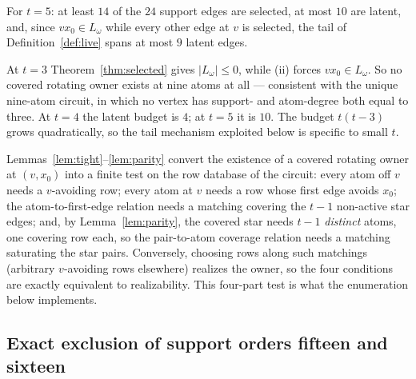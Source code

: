 \begin{corollary}\label{cor:latent}
For \(t=5\): at least \(14\) of the \(24\) support edges are selected,
at most \(10\) are latent, and, since \(vx_0\in L_\omega\) while every
other edge at \(v\) is selected, the tail of
Definition~\ref{def:live} spans at most \(9\) latent edges.
\end{corollary}

\begin{remark}\label{rem:t3}
At \(t=3\) Theorem~\ref{thm:selected} gives \(|L_\omega|\le0\), while
(ii) forces \(vx_0\in L_\omega\). So no covered rotating owner exists
at nine atoms at all --- consistent with the unique nine-atom circuit,
in which no vertex has support- and atom-degree both equal to three.
At \(t=4\) the latent budget is \(4\); at \(t=5\) it is \(10\). The
budget \(t(t-3)\) grows quadratically, so the tail mechanism exploited
below is specific to small \(t\).
\end{remark}

\begin{remark}
Lemmas~\ref{lem:tight}--\ref{lem:parity} convert the existence of a
covered rotating owner at \((v,x_0)\) into a finite test on the row
database of the circuit: every atom off \(v\) needs a \(v\)-avoiding
row; every atom at \(v\) needs a row whose first edge avoids
\(x_0\); the atom-to-first-edge relation needs a matching covering the
\(t-1\) non-active star edges; and, by Lemma~\ref{lem:parity}, the
covered star needs \(t-1\) \emph{distinct} atoms, one covering row
each, so the pair-to-atom coverage relation needs a matching
saturating the star pairs. Conversely, choosing rows along such
matchings (arbitrary \(v\)-avoiding rows elsewhere) realizes the
owner, so the four conditions are exactly equivalent to realizability.
This four-part test is what the enumeration below implements.
\end{remark}

\subsection{Exact exclusion of support orders fifteen and sixteen}

